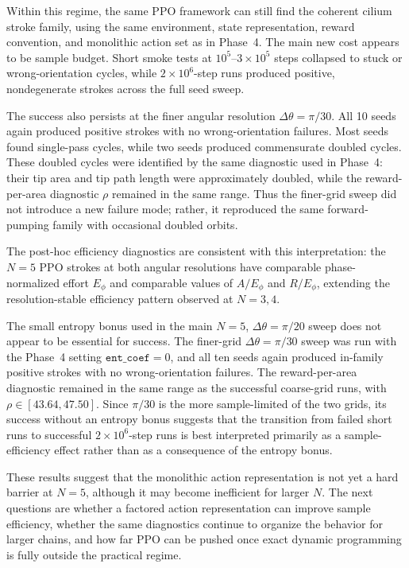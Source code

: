 \documentclass[11pt]{article}
\begin{document}
Within this regime, the same PPO framework can still find the coherent cilium
stroke family, using the same environment, state representation, reward
convention, and monolithic action set as in Phase~4. The main new cost appears
to be sample budget. Short smoke tests at $10^5$--$3\times 10^5$ steps
collapsed to stuck or wrong-orientation cycles, while $2\times 10^6$-step runs
produced positive, nondegenerate strokes across the full seed sweep.

The success also persists at the finer angular resolution
$\Delta\theta=\pi/30$. All 10 seeds again produced positive strokes with no
wrong-orientation failures. Most seeds found single-pass cycles, while two
seeds produced commensurate doubled cycles. These doubled cycles were
identified by the same diagnostic used in Phase~4: their tip area and tip path
length were approximately doubled, while the reward-per-area diagnostic
$\rho$ remained in the same range. Thus the finer-grid sweep did not introduce
a new failure mode; rather, it reproduced the same forward-pumping family with
occasional doubled orbits.

The post-hoc efficiency diagnostics are consistent with this interpretation:
the $N=5$ PPO strokes at both angular resolutions have comparable
phase-normalized effort $E_\phi$ and comparable values of $A/E_\phi$ and
$R/E_\phi$, extending the resolution-stable efficiency pattern observed at
$N=3,4$.

The small entropy bonus used in the main $N=5$, $\Delta\theta=\pi/20$
sweep does not appear to be essential for success. The finer-grid
$\Delta\theta=\pi/30$ sweep was run with the Phase~4 setting
$\texttt{ent\_coef}=0$, and all ten seeds again produced in-family
positive strokes with no wrong-orientation failures. The reward-per-area
diagnostic remained in the same range as the successful coarse-grid runs,
with $\rho \in [43.64,47.50]$. Since $\pi/30$ is the more sample-limited
of the two grids, its success without an entropy bonus suggests that the
transition from failed short runs to successful $2\times 10^6$-step runs
is best interpreted primarily as a sample-efficiency effect rather than
as a consequence of the entropy bonus.

These results suggest that the monolithic action representation is not yet a
hard barrier at $N=5$, although it may become inefficient for larger $N$. The
next questions are whether a factored action representation can improve sample
efficiency, whether the same diagnostics continue to organize the behavior for
larger chains, and how far PPO can be pushed once exact dynamic programming is
fully outside the practical regime.




\end{document}
